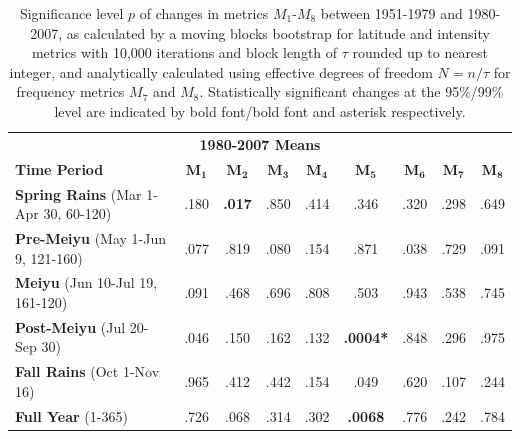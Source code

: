 \documentclass{ametsoc}
\begin{document}
\begin{table}[p]

\centering

\caption{Significance level $p$ of changes in metrics $M_1$-$M_8$ between 1951-1979 and 1980-2007, as calculated by a moving blocks bootstrap for latitude and intensity metrics with 10,000 iterations and block length of $\tau$ rounded up to nearest integer, and analytically calculated using effective degrees of freedom $N=n/\tau$ for frequency metrics $M_7$ and $M_8$. Statistically significant changes at the 95\%/99\% level are indicated by bold font/bold font and asterisk respectively.}

\begin{tabular}{ l c c c c c c c c}
	 \multicolumn{9}{c}{\textbf{1980-2007 Means}} \\
	 \textbf{Time Period} 						& $\boldsymbol{M_1}$ & $\boldsymbol{M_2}$ & $\boldsymbol{M_3}$ & $\boldsymbol{M_4}$ & $\boldsymbol{M_5}$ & $\boldsymbol{M_6}$ & $\boldsymbol{M_7}$ & $\boldsymbol{M_8}$ \\	 
	 \hline
	\textbf{Spring Rains} (Mar 1-Apr 30, 60-120) 	& .180 & \textbf{.017} 	& .850 & .414 	& .346 			& .320 & .298 & .649 \\
	\textbf{Pre-Meiyu} (May 1-Jun 9, 121-160) 		& .077 & .819 			& .080 & .154 & .871 			& .038 & .729 & .091 \\		
	\textbf{Meiyu} (Jun 10-Jul 19, 161-120) 		& .091 & .468 			& .696 & .808 & .503 			& .943 & .538 & .745 \\
	\textbf{Post-Meiyu} (Jul 20-Sep 30) 			& .046 & .150 			& .162 & .132 & \textbf{.0004*} 	& .848 & .296 & .975 \\
	\textbf{Fall Rains} (Oct 1-Nov 16) 				& .965 & .412 			& .442 & .154 & .049 			& .620 & .107 & .244 \\
	\textbf{Full Year} (1-365)	 				& .726 & .068 			& .314 & .302 & \textbf{.0068} 	& .776 & .242 & .784 \\
	
\end{tabular}
\label{tab:t312}
\end{table}
\end{document}
